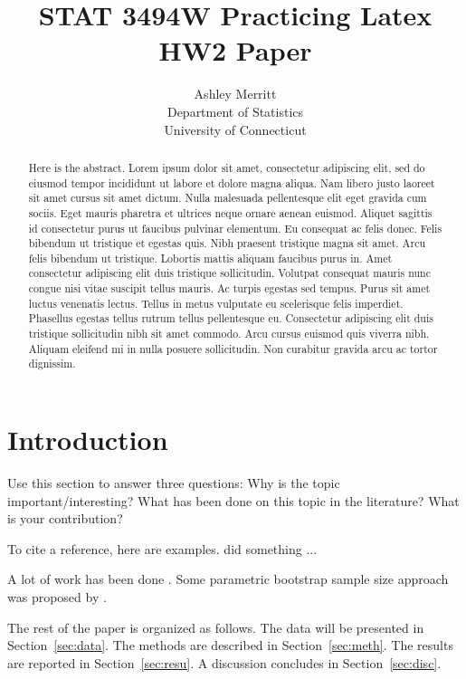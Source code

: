\documentclass[12pt]{article}
\title{STAT 3494W Practicing Latex HW2 Paper}
\author{Ashley Merritt\\
  Department of Statistics\\
  University of Connecticut
}
\begin{document}
\maketitle

\begin{abstract}
Here is the abstract. Lorem ipsum dolor sit amet, consectetur adipiscing elit, sed do eiusmod tempor incididunt ut labore et dolore magna aliqua. Nam libero justo laoreet sit amet cursus sit amet dictum. Nulla malesuada pellentesque elit eget gravida cum sociis. Eget mauris pharetra et ultrices neque ornare aenean euismod. Aliquet sagittis id consectetur purus ut faucibus pulvinar elementum. Eu consequat ac felis donec. Felis bibendum ut tristique et egestas quis. Nibh praesent tristique magna sit amet. Arcu felis bibendum ut tristique. Lobortis mattis aliquam faucibus purus in. Amet consectetur adipiscing elit duis tristique sollicitudin. Volutpat consequat mauris nunc congue nisi vitae suscipit tellus mauris. Ac turpis egestas sed tempus. Purus sit amet luctus venenatis lectus. Tellus in metus vulputate eu scelerisque felis imperdiet. Phasellus egestas tellus rutrum tellus pellentesque eu. Consectetur adipiscing elit duis tristique sollicitudin nibh sit amet commodo. Arcu cursus euismod quis viverra nibh. Aliquam eleifend mi in nulla posuere sollicitudin. Non curabitur gravida arcu ac tortor dignissim.
\end{abstract}


\section{Introduction}
\label{sec:intro}

Use this section to answer three questions:
Why is the topic important/interesting?
What has been done on this topic in the literature?
What is your contribution?

\lipsum[1-3]

To cite a reference, here are examples.
\citet{White1952Web} did something ... \lipsum[1]

A lot of work has been done \citep[e.g.,][]{White1952Web}.
\lipsum[2]
Some parametric bootstrap sample size approach was proposed by
\citet{Grenier2019pickleball}. 


The rest of the paper is organized as follows.
The data will be presented in Section~\ref{sec:data}.
The methods are described in Section~\ref{sec:meth}.
The results are reported in Section~\ref{sec:resu}.
A discussion concludes in Section~\ref{sec:disc}.
\end{document}
